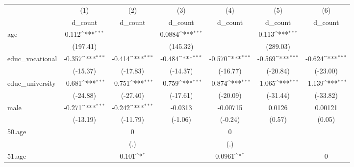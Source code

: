 {
\def\sym#1{\ifmmode^{#1}\else\(^{#1}\)\fi}
\begin{tabular}{l*{6}{c}}
\hline\hline
            &\multicolumn{1}{c}{(1)}&\multicolumn{1}{c}{(2)}&\multicolumn{1}{c}{(3)}&\multicolumn{1}{c}{(4)}&\multicolumn{1}{c}{(5)}&\multicolumn{1}{c}{(6)}\\
            &\multicolumn{1}{c}{d\_count}&\multicolumn{1}{c}{d\_count}&\multicolumn{1}{c}{d\_count}&\multicolumn{1}{c}{d\_count}&\multicolumn{1}{c}{d\_count}&\multicolumn{1}{c}{d\_count}\\
\hline
age         &       0.112\sym{***}&                     &      0.0884\sym{***}&                     &       0.113\sym{***}&                     \\
            &    (197.41)         &                     &    (145.32)         &                     &    (289.03)         &                     \\
[1em]
educ\_vocational&      -0.357\sym{***}&      -0.414\sym{***}&      -0.484\sym{***}&      -0.570\sym{***}&      -0.569\sym{***}&      -0.624\sym{***}\\
            &    (-15.37)         &    (-17.83)         &    (-14.37)         &    (-16.77)         &    (-20.84)         &    (-23.00)         \\
[1em]
educ\_university&      -0.681\sym{***}&      -0.751\sym{***}&      -0.759\sym{***}&      -0.874\sym{***}&      -1.065\sym{***}&      -1.139\sym{***}\\
            &    (-24.88)         &    (-27.40)         &    (-17.61)         &    (-20.09)         &    (-31.44)         &    (-33.82)         \\
[1em]
male        &      -0.271\sym{***}&      -0.242\sym{***}&     -0.0313         &    -0.00715         &      0.0126         &     0.00121         \\
            &    (-13.19)         &    (-11.79)         &     (-1.06)         &     (-0.24)         &      (0.57)         &      (0.05)         \\
[1em]
50.age      &                     &           0         &                     &           0         &                     &                     \\
            &                     &         (.)         &                     &         (.)         &                     &                     \\
[1em]
51.age      &                     &       0.101\sym{*}  &                     &      0.0961\sym{*}  &                     &           0         \\

\end{tabular}}
